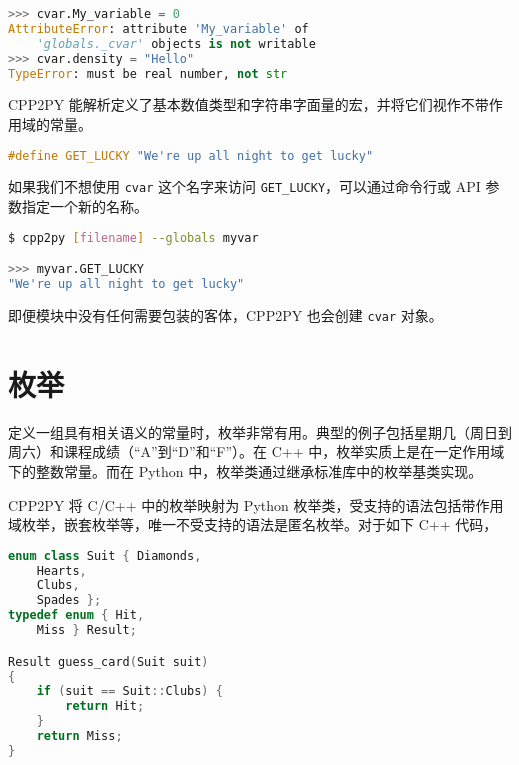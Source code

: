 \begin{framed}
\begin{lstlisting}[language=python]
>>> cvar.My_variable = 0
AttributeError: attribute 'My_variable' of 
    'globals._cvar' objects is not writable
>>> cvar.density = "Hello"
TypeError: must be real number, not str
\end{lstlisting}
\end{framed}

CPP2PY 能解析定义了基本数值类型和字符串字面量的宏，并将它们视作不带作用域的常量。

\begin{framed}
\begin{lstlisting}[language=c++]
#define GET_LUCKY "We're up all night to get lucky"
\end{lstlisting}
\end{framed}

如果我们不想使用 \lstinline{cvar} 这个名字来访问 \lstinline{GET_LUCKY}，可以通过命令行或 API 参数指定一个新的名称。

\begin{framed}
\begin{lstlisting}[language=sh]
$ cpp2py [filename] --globals myvar

>>> myvar.GET_LUCKY
"We're up all night to get lucky"
\end{lstlisting}
\end{framed}

即便模块中没有任何需要包装的客体，CPP2PY 也会创建 \lstinline{cvar} 对象。

\section{枚举}

定义一组具有相关语义的常量时，枚举非常有用。典型的例子包括星期几（周日到周六）和课程成绩（“A”到“D”和“F”）。在 C++ 中，枚举实质上是在一定作用域下的整数常量。而在 Python 中，枚举类通过继承标准库中的枚举基类实现。

CPP2PY 将 C/C++ 中的枚举映射为 Python 枚举类，受支持的语法包括带作用域枚举，嵌套枚举等，唯一不受支持的语法是匿名枚举。对于如下 C++ 代码，

\begin{framed}
\begin{lstlisting}[language=c++]
enum class Suit { Diamonds,
    Hearts,
    Clubs,
    Spades };
typedef enum { Hit,
    Miss } Result;

Result guess_card(Suit suit)
{
    if (suit == Suit::Clubs) {
        return Hit;
    }
    return Miss;
}
\end{lstlisting}
\end{framed}

